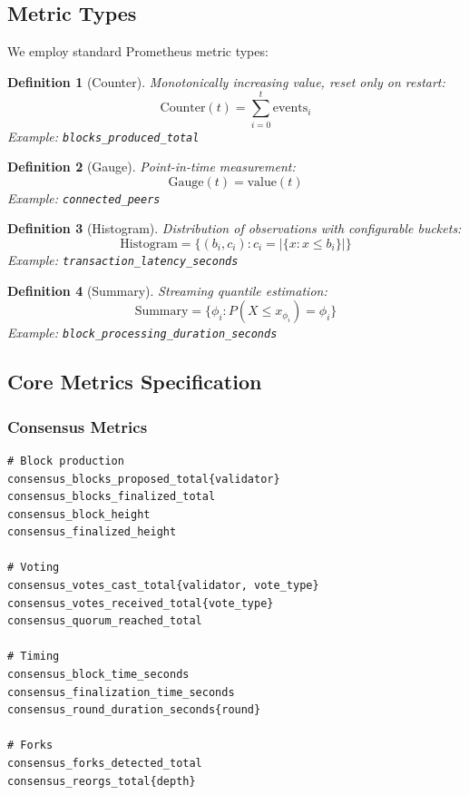 \documentclass[11pt,a4paper]{article}
\newtheorem{definition}{Definition}
\begin{document}
\subsection{Metric Types}

We employ standard Prometheus metric types:

\begin{definition}[Counter]
Monotonically increasing value, reset only on restart:
\[
\text{Counter}(t) = \sum_{i=0}^{t} \text{events}_i
\]
Example: \texttt{blocks\_produced\_total}
\end{definition}

\begin{definition}[Gauge]
Point-in-time measurement:
\[
\text{Gauge}(t) = \text{value}(t)
\]
Example: \texttt{connected\_peers}
\end{definition}

\begin{definition}[Histogram]
Distribution of observations with configurable buckets:
\[
\text{Histogram} = \{(b_i, c_i) : c_i = |\{x : x \leq b_i\}|\}
\]
Example: \texttt{transaction\_latency\_seconds}
\end{definition}

\begin{definition}[Summary]
Streaming quantile estimation:
\[
\text{Summary} = \{\phi_i : P(X \leq x_{\phi_i}) = \phi_i\}
\]
Example: \texttt{block\_processing\_duration\_seconds}
\end{definition}

\subsection{Core Metrics Specification}

\subsubsection{Consensus Metrics}

\begin{lstlisting}
# Block production
consensus_blocks_proposed_total{validator}
consensus_blocks_finalized_total
consensus_block_height
consensus_finalized_height

# Voting
consensus_votes_cast_total{validator, vote_type}
consensus_votes_received_total{vote_type}
consensus_quorum_reached_total

# Timing
consensus_block_time_seconds
consensus_finalization_time_seconds
consensus_round_duration_seconds{round}

# Forks
consensus_forks_detected_total
consensus_reorgs_total{depth}
\end{lstlisting}
\end{document}
